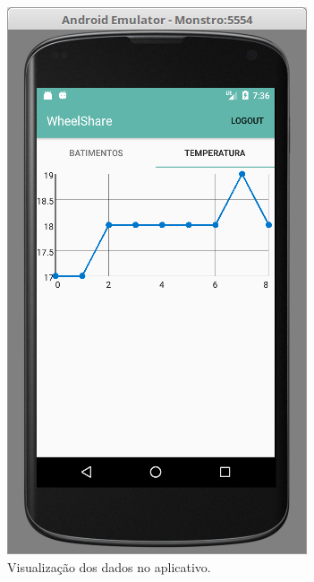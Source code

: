 \begin{figure}[h!]
    \begin{center}
        \includegraphics[scale=0.5]{figuras/android1.png}
    \end{center}
    \caption{Visualização dos dados no aplicativo.}
    \label{fig:android1}
\end{figure}





